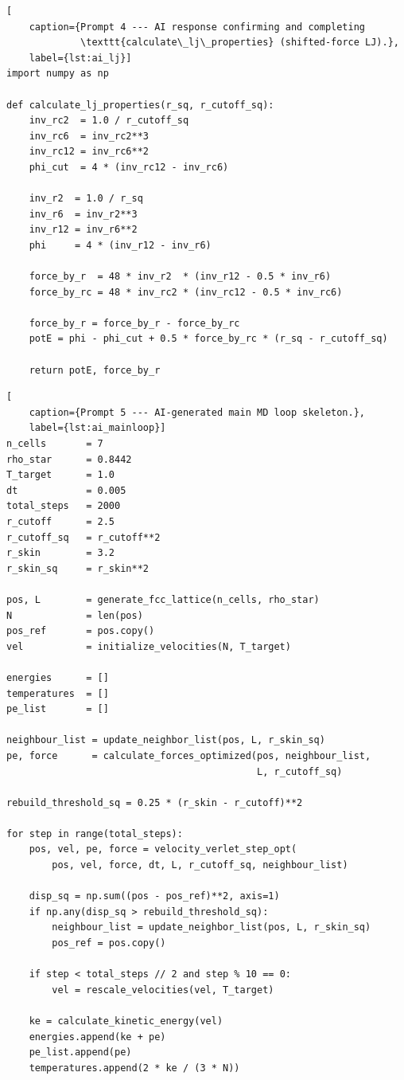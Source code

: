 \begin{lstlisting}[
    caption={Prompt 4 --- AI response confirming and completing
             \texttt{calculate\_lj\_properties} (shifted-force LJ).},
    label={lst:ai_lj}]
import numpy as np
 
def calculate_lj_properties(r_sq, r_cutoff_sq):
    inv_rc2  = 1.0 / r_cutoff_sq
    inv_rc6  = inv_rc2**3
    inv_rc12 = inv_rc6**2
    phi_cut  = 4 * (inv_rc12 - inv_rc6)
 
    inv_r2  = 1.0 / r_sq
    inv_r6  = inv_r2**3
    inv_r12 = inv_r6**2
    phi     = 4 * (inv_r12 - inv_r6)
 
    force_by_r  = 48 * inv_r2  * (inv_r12 - 0.5 * inv_r6)
    force_by_rc = 48 * inv_rc2 * (inv_rc12 - 0.5 * inv_rc6)
 
    force_by_r = force_by_r - force_by_rc
    potE = phi - phi_cut + 0.5 * force_by_rc * (r_sq - r_cutoff_sq)
 
    return potE, force_by_r
\end{lstlisting}
 
\begin{lstlisting}[
    caption={Prompt 5 --- AI-generated main MD loop skeleton.},
    label={lst:ai_mainloop}]
n_cells       = 7
rho_star      = 0.8442
T_target      = 1.0
dt            = 0.005
total_steps   = 2000
r_cutoff      = 2.5
r_cutoff_sq   = r_cutoff**2
r_skin        = 3.2
r_skin_sq     = r_skin**2
 
pos, L        = generate_fcc_lattice(n_cells, rho_star)
N             = len(pos)
pos_ref       = pos.copy()
vel           = initialize_velocities(N, T_target)
 
energies      = []
temperatures  = []
pe_list       = []
 
neighbour_list = update_neighbor_list(pos, L, r_skin_sq)
pe, force      = calculate_forces_optimized(pos, neighbour_list,
                                            L, r_cutoff_sq)
 
rebuild_threshold_sq = 0.25 * (r_skin - r_cutoff)**2
 
for step in range(total_steps):
    pos, vel, pe, force = velocity_verlet_step_opt(
        pos, vel, force, dt, L, r_cutoff_sq, neighbour_list)
 
    disp_sq = np.sum((pos - pos_ref)**2, axis=1)
    if np.any(disp_sq > rebuild_threshold_sq):
        neighbour_list = update_neighbor_list(pos, L, r_skin_sq)
        pos_ref = pos.copy()
 
    if step < total_steps // 2 and step % 10 == 0:
        vel = rescale_velocities(vel, T_target)
 
    ke = calculate_kinetic_energy(vel)
    energies.append(ke + pe)
    pe_list.append(pe)
    temperatures.append(2 * ke / (3 * N))
\end{lstlisting}
 
